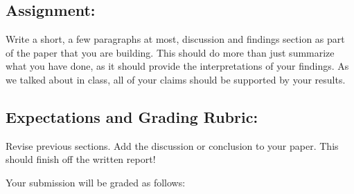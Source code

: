 \documentclass[11pt]{article}
\begin{document}
\subsection*{Assignment:}
Write a short, a few paragraphs at most, discussion and findings section as part of the paper that you are building.  This should do more than just summarize what you have done, as it should provide the interpretations of your findings.  As we talked about in class, all of your claims should be supported by your results.

\subsection*{Expectations and Grading Rubric:}
Revise previous sections.  Add the discussion or conclusion to your paper.  This should finish off the written report!

Your submission will be graded as follows:
\end{document}
